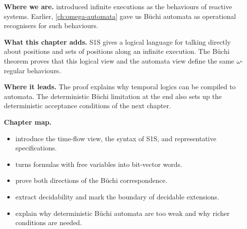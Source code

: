 \begin{chapteropening}
\textbf{Where we are.}   introduced infinite executions
as the behaviours of reactive systems.  Earlier, \cref{ch:omega-automata}
gave us B\"uchi automata as operational recognisers for such behaviours.

\textbf{What this chapter adds.}  S1S gives a logical language for talking
directly about positions and sets of positions along an infinite execution.
The B\"uchi theorem proves that this logical view and the automata view define
the same $\omega$-regular behaviours.

\textbf{Where it leads.}  The proof explains why temporal logics can be
compiled to automata.  The deterministic B\"uchi limitation at the end also
sets up the deterministic acceptance conditions of the next chapter.

\textbf{Chapter map.}
\begin{itemize}[nosep]
  \item {} introduce the
        time-flow view, the syntax of S1S, and representative specifications.
  \item {} turns formulas with free variables into
        bit-vector words.
  \item {}
        prove both directions of the B\"uchi correspondence.
  \item {} extract decidability
        and mark the boundary of decidable extensions.
  \item {} explain why deterministic B\"uchi
        automata are too weak and why richer conditions are needed.
\end{itemize}
\end{chapteropening}


